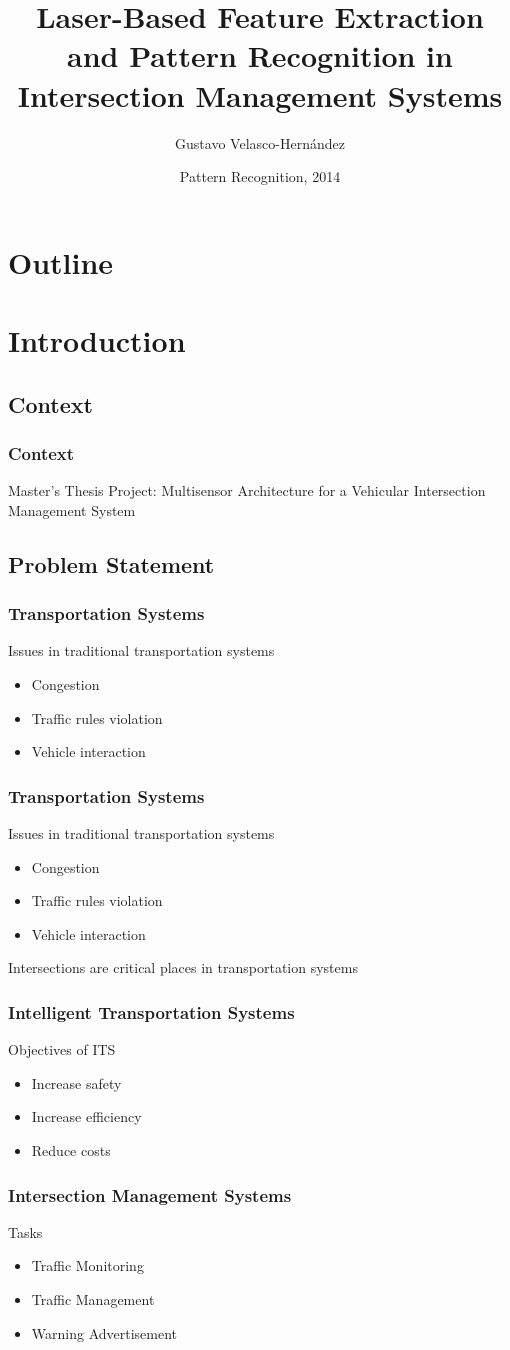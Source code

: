 \documentclass{beamer}
\title[Laser-Based Feature Extraction and Pattern Recognition in IMS]{Laser-Based Feature Extraction and Pattern Recognition in Intersection Management Systems}
\author{Gustavo Velasco-Hernández}
\institute[Universidad del Valle]
{
	
}
\date{Pattern Recognition, 2014}
\begin{document}
\frame{\titlepage}
\section*{Outline}

\frame{\tableofcontents}
\section{Introduction}

\subsection{Context}
\frame
{
	\frametitle{Context}
	Master's Thesis Project:
	Multisensor Architecture for a Vehicular Intersection Management System
}
\subsection{Problem Statement}
\frame
{
	\frametitle{Transportation Systems}
	Issues in traditional transportation systems
	\begin{itemize}
		\item Congestion
		\item Traffic rules violation
		\item Vehicle interaction
	\end{itemize}
}

\frame
{
	\frametitle{Transportation Systems}
	Issues in traditional transportation systems
	\begin{itemize}
		\item Congestion
		\item Traffic rules violation
		\item Vehicle interaction
	\end{itemize}
	Intersections are critical places in transportation systems
}

\frame
{
	\frametitle{Intelligent Transportation Systems}
	Objectives of ITS
	\begin{itemize}
		\item Increase safety
		\item Increase efficiency
		\item Reduce costs
	\end{itemize}
}

\frame
{
	\frametitle{Intersection Management Systems}
	Tasks
	\begin{itemize}
		\item Traffic Monitoring
		\item Traffic Management
		\item Warning Advertisement
	\end{itemize}
}
\end{document}
